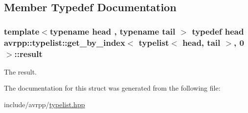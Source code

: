 \subsection{Member Typedef Documentation}
\hypertarget{structavrpp_1_1typelist_1_1get__by__index_3_01typelist_3_01head_00_01tail_01_4_00_010_01_4_af1f4b9307e52171dec914610ee16c4e0}{
\subsubsection[{result}]{\setlength{\rightskip}{0pt plus 5cm}template$<$typename head , typename tail $>$ typedef head avrpp::typelist::get\_\-by\_\-index$<$ {\bf typelist}$<$ head, tail $>$, 0 $>$::{\bf result}}}
\label{structavrpp_1_1typelist_1_1get__by__index_3_01typelist_3_01head_00_01tail_01_4_00_010_01_4_af1f4b9307e52171dec914610ee16c4e0}


The result. 



The documentation for this struct was generated from the following file:\begin{DoxyCompactItemize}
\item 
include/avrpp/\hyperlink{typelist_8hpp}{typelist.hpp}\end{DoxyCompactItemize}
